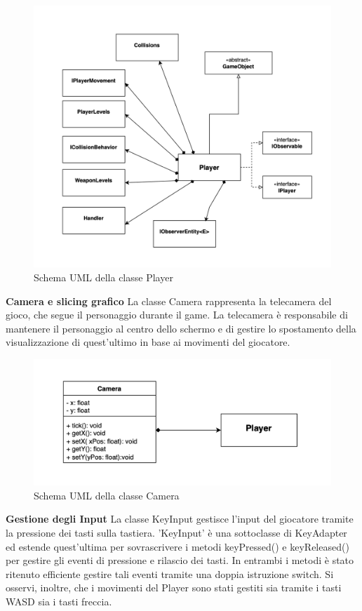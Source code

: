 \documentclass[a4paper,12pt]{report}
\begin{document}
\begin{figure}[H]
	\centering{}
\includegraphics[width=\textwidth]{img/Player.png}
	\caption{Schema UML della classe Player}
\end{figure}

\textbf{Camera e slicing grafico}
La classe Camera rappresenta la telecamera del gioco, che segue il personaggio  durante il game. La telecamera è responsabile di mantenere il personaggio al centro dello schermo e di gestire lo spostamento della visualizzazione di quest'ultimo in base ai movimenti del giocatore.

\begin{figure}[H]
	\centering{}
\includegraphics[width=\textwidth]{img/Camera.png}
	\caption{Schema UML della classe Camera}
\end{figure}

\textbf{Gestione degli Input}
La classe KeyInput gestisce l'input del giocatore tramite la pressione dei tasti sulla tastiera. 'KeyInput' è una sottoclasse di KeyAdapter ed estende quest'ultima per sovrascrivere i metodi keyPressed() e keyReleased() per gestire gli eventi di pressione e rilascio dei tasti. In entrambi i metodi è stato ritenuto efficiente gestire tali eventi tramite una doppia istruzione switch. Si osservi, inoltre, che i movimenti del Player sono stati gestiti sia tramite i tasti WASD sia i tasti freccia.
\end{document}
